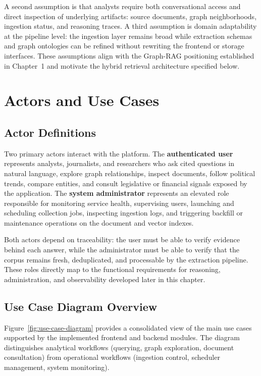 A second assumption is that analysts require both conversational access and direct inspection of underlying artifacts: source documents, graph neighborhoods, ingestion status, and reasoning traces. A third assumption is domain adaptability at the pipeline level: the ingestion layer remains broad while extraction schemas and graph ontologies can be refined without rewriting the frontend or storage interfaces. These assumptions align with the Graph-RAG positioning established in Chapter~1 and motivate the hybrid retrieval architecture specified below.

\section{Actors and Use Cases}

\subsection{Actor Definitions}

Two primary actors interact with the platform. The \textbf{authenticated user} represents analysts, journalists, and researchers who ask cited questions in natural language, explore graph relationships, inspect documents, follow political trends, compare entities, and consult legislative or financial signals exposed by the application. The \textbf{system administrator} represents an elevated role responsible for monitoring service health, supervising users, launching and scheduling collection jobs, inspecting ingestion logs, and triggering backfill or maintenance operations on the document and vector indexes.

Both actors depend on traceability: the user must be able to verify evidence behind each answer, while the administrator must be able to verify that the corpus remains fresh, deduplicated, and processable by the extraction pipeline. These roles directly map to the functional requirements for reasoning, administration, and observability developed later in this chapter.

\subsection{Use Case Diagram Overview}

Figure~\ref{fig:use-case-diagram} provides a consolidated view of the main use cases supported by the implemented frontend and backend modules. The diagram distinguishes analytical workflows (querying, graph exploration, document consultation) from operational workflows (ingestion control, scheduler management, system monitoring).

